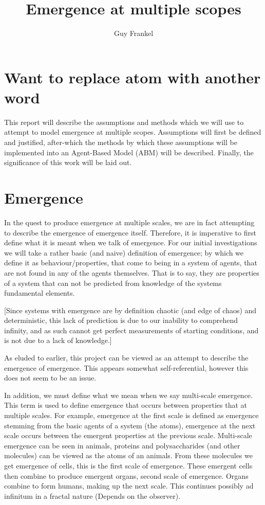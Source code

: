 \documentclass{article}
\title{Emergence at multiple scopes}
\author{Guy Frankel}
\date{}
\begin{document}
\maketitle
\vspace{-13mm}

\section{Want to replace atom with another word}


This report will describe the assumptions and methods which we will use to attempt to model emergence at multiple scopes. Assumptions will first be defined and justified, after-which the methods by which these assumptions will be implemented into an Agent-Based Model (ABM) will be described. Finally, the significance of this work will be laid out.


\section{Emergence}

  In the quest to produce emergence at multiple scales, we are in fact attempting to describe the emergence of emergence itself. Therefore, it is imperative to first define what it is meant when we talk of emergence. For our initial investigations we will take a rather basic (and naive) definition of emergence; by which we define it as behaviour/properties, that come to being in a system of agents, that are not found in any of the agents themselves. That is to say, they are properties of a system that can not be predicted from knowledge of the systems fundamental elements.

  [Since systems with emergence are by definition chaotic (and edge of chaos) and deterministic, this lack of prediction is due to our inability to comprehend infinity, and as such cannot get perfect measurements of starting conditions, and is not due to a lack of knowledge.]

  As eluded to earlier, this project can be viewed as an attempt to describe the emergence of emergence. This appears somewhat self-referential, however this does not seem to be an issue.

  In addition, we must define what we mean when we say multi-scale emergence. This term is used to define emergence that occurs between properties that at multiple scales. For example, emergence at the first scale is defined as emergence stemming from the basic agents of a system (the atoms), emergence at the next scale occurs between the emergent properties at the previous scale. Multi-scale emergence can be seen in animals, proteins and polysaccharides (and other molecules) can be viewed as the atoms of an animals. From these molecules we get emergence of cells, this is the first scale of emergence. These emergent cells then combine to produce emergent organs, second scale of emergence. Organs combine to form humans, making up the next scale. This continues possibly ad infinitum in a fractal nature (Depends on the observer).
\end{document}
